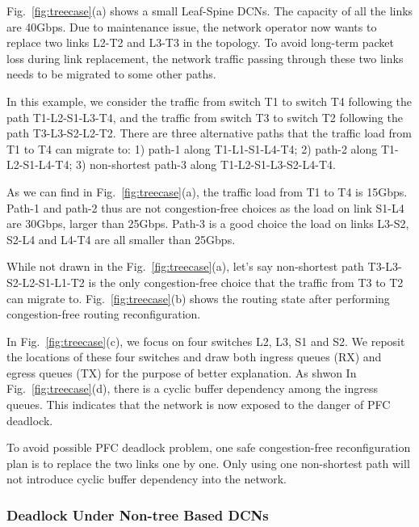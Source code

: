 Fig.~\ref{fig:treecase}(a) shows a small Leaf-Spine DCNs. The capacity of all the links are 40Gbps. Due to maintenance issue, the network operator now wants to replace two links L2-T2 and L3-T3 in the topology. To avoid long-term packet loss during link replacement, the network traffic passing through these two links needs to be migrated to some other paths. 

In this example, we consider the traffic from switch T1 to switch T4 following the path T1-L2-S1-L3-T4, and the traffic from switch T3 to switch T2 following the path T3-L3-S2-L2-T2. There are three alternative paths that the traffic load from T1 to T4 can migrate to: 1) path-1 along T1-L1-S1-L4-T4; 2) path-2 along T1-L2-S1-L4-T4; 3) non-shortest path-3 along T1-L2-S1-L3-S2-L4-T4. 

As we can find in Fig.~\ref{fig:treecase}(a), the traffic load from T1 to T4 is 15Gbps. Path-1 and path-2 thus are not congestion-free choices as the load on link S1-L4 are 30Gbps, larger than 25Gbps. Path-3 is a good choice the load on links L3-S2, S2-L4 and L4-T4 are all smaller than 25Gbps. 

While not drawn in the Fig.~\ref{fig:treecase}(a), let's say non-shortest path T3-L3-S2-L2-S1-L1-T2 is the only congestion-free choice that the traffic from T3 to T2 can migrate to. Fig.~\ref{fig:treecase}(b) shows the routing state after performing congestion-free routing reconfiguration. 

In Fig.~\ref{fig:treecase}(c), we focus on four switches L2, L3, S1 and S2. We reposit the locations of these four switches and draw both ingress queues (RX) and egress queues (TX) for the purpose of better explanation. As shwon In Fig.~\ref{fig:treecase}(d), there is a cyclic buffer dependency among the ingress queues. This indicates that the network is now exposed to the danger of PFC deadlock.

To avoid possible PFC deadlock problem, one safe congestion-free reconfiguration plan is to replace the two links one by one. Only using one non-shortest path will not introduce cyclic buffer dependency into the network.

\subsubsection{Deadlock Under Non-tree Based DCNs}\label{subsubsec:nontreecase}


